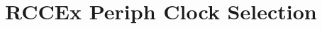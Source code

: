 \hypertarget{group___r_c_c_ex___periph___clock___selection}{}\section{R\+C\+C\+Ex Periph Clock Selection}
\label{group___r_c_c_ex___periph___clock___selection}
